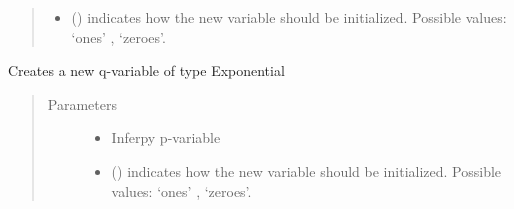 \documentclass[letterpaper,10pt,english]{sphinxmanual}
\begin{document}
\begin{fulllineitems}
\begin{fulllineitems}
\begin{quote}
\begin{description}
\begin{itemize}
\item {} 
 () \textendash{} indicates how the new variable should be initialized. Possible values: ‘ones’ , ‘zeroes’.

\end{itemize}

\end{description}\end{quote}

\end{fulllineitems}


\begin{fulllineitems}
\label{\detokenize{modules/inferpy.inferences:inferpy.inferences.qmodel.Qmodel.Empirical}}
\end{fulllineitems}


\begin{fulllineitems}
\label{\detokenize{modules/inferpy.inferences:inferpy.inferences.qmodel.Qmodel.Exponential}}
Creates a new q-variable of type Exponential
\begin{quote}\begin{description}
\item[{Parameters}] \leavevmode\begin{itemize}
\item {} 
 \textendash{} Inferpy p-variable

\item {} 
 () \textendash{} indicates how the new variable should be initialized. Possible values: ‘ones’ , ‘zeroes’.

\end{itemize}

\end{description}\end{quote}

\end{fulllineitems}



\end{fulllineitems}
\end{document}
